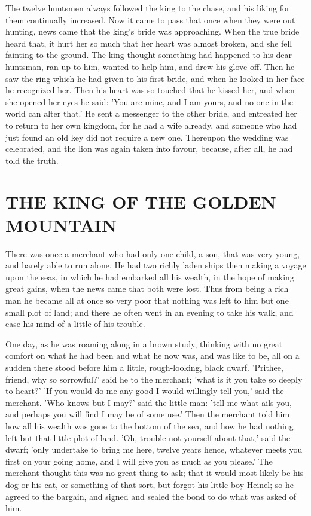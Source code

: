 \documentclass[12pt]{book}
\begin{document}
The twelve huntsmen always followed the king to the chase, and his
liking for them continually increased. Now it came to pass that once
when they were out hunting, news came that the king's bride was
approaching. When the true bride heard that, it hurt her so much that
her heart was almost broken, and she fell fainting to the ground. The
king thought something had happened to his dear huntsman, ran up to
him, wanted to help him, and drew his glove off. Then he saw the ring
which he had given to his first bride, and when he looked in her face
he recognized her. Then his heart was so touched that he kissed her,
and when she opened her eyes he said: 'You are mine, and I am yours,
and no one in the world can alter that.' He sent a messenger to the
other bride, and entreated her to return to her own kingdom, for he
had a wife already, and someone who had just found an old key did not
require a new one. Thereupon the wedding was celebrated, and the lion
was again taken into favour, because, after all, he had told the
truth.



\chapter{THE KING OF THE GOLDEN MOUNTAIN}

There was once a merchant who had only one child, a son, that was very
young, and barely able to run alone. He had two richly laden ships
then making a voyage upon the seas, in which he had embarked all his
wealth, in the hope of making great gains, when the news came that
both were lost. Thus from being a rich man he became all at once so
very poor that nothing was left to him but one small plot of land; and
there he often went in an evening to take his walk, and ease his mind
of a little of his trouble.

One day, as he was roaming along in a brown study, thinking with no
great comfort on what he had been and what he now was, and was like to
be, all on a sudden there stood before him a little, rough-looking,
black dwarf. 'Prithee, friend, why so sorrowful?' said he to the
merchant; 'what is it you take so deeply to heart?' 'If you would do
me any good I would willingly tell you,' said the merchant. 'Who knows
but I may?' said the little man: 'tell me what ails you, and perhaps
you will find I may be of some use.' Then the merchant told him how
all his wealth was gone to the bottom of the sea, and how he had
nothing left but that little plot of land. 'Oh, trouble not yourself
about that,' said the dwarf; 'only undertake to bring me here, twelve
years hence, whatever meets you first on your going home, and I will
give you as much as you please.' The merchant thought this was no
great thing to ask; that it would most likely be his dog or his cat,
or something of that sort, but forgot his little boy Heinel; so he
agreed to the bargain, and signed and sealed the bond to do what was
asked of him.
\end{document}
